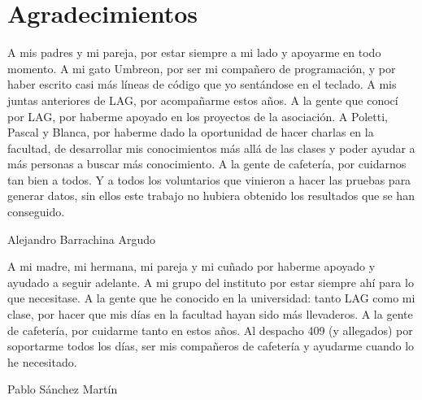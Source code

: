 
\chapter*{Agradecimientos}

A mis padres y mi pareja, por estar siempre a mi lado y apoyarme en todo momento.
A mi gato Umbreon, por ser mi compañero de programación, y por haber escrito casi más líneas de código que yo sentándose en el teclado.
A mis juntas anteriores de LAG, por acompañarme estos años.
A la gente que conocí por LAG, por haberme apoyado en los proyectos de la asociación.
A Poletti, Pascal y Blanca, por haberme dado la oportunidad de hacer charlas en la facultad, de desarrollar mis conocimientos más allá de las clases y poder ayudar a más personas a buscar más conocimiento.
A la gente de cafetería, por cuidarnos tan bien a todos.
Y a todos los voluntarios que vinieron a hacer las pruebas para generar datos, sin ellos este trabajo no hubiera obtenido los resultados que se han conseguido.

\begin{flushright}
    Alejandro Barrachina Argudo
\end{flushright}

A mi madre, mi hermana, mi pareja y mi cuñado por haberme apoyado y ayudado a seguir adelante.
A mi grupo del instituto por estar siempre ahí para lo que necesitase.
A la gente que he conocido en la universidad: tanto LAG como mi clase, por hacer que mis días en la facultad hayan sido más llevaderos.
A la gente de cafetería, por cuidarme tanto en estos años.
Al despacho 409 (y allegados) por soportarme todos los días, ser mis compañeros de cafetería y ayudarme cuando lo he necesitado.


\begin{flushright}
    Pablo Sánchez Martín
\end{flushright}






